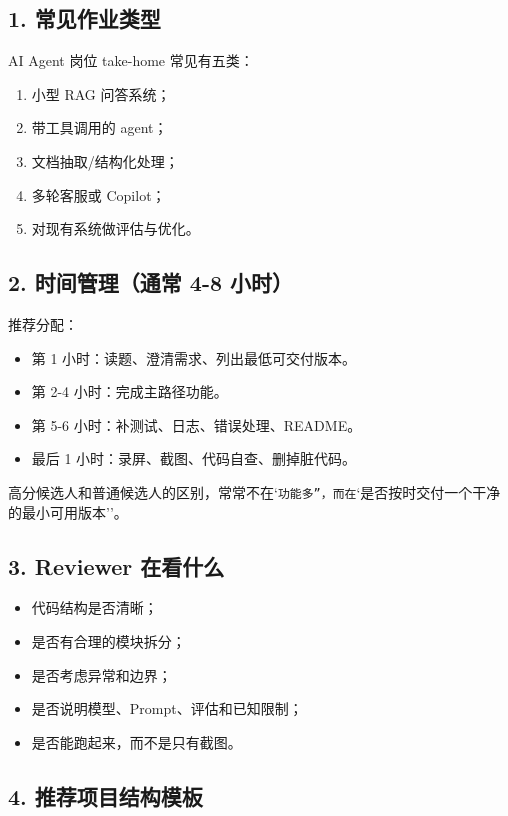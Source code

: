 \subsection{1. 常见作业类型}
AI Agent 岗位 take-home 常见有五类：

\begin{enumerate}[leftmargin=2em]
\item 小型 RAG 问答系统；
\item 带工具调用的 agent；
\item 文档抽取/结构化处理；
\item 多轮客服或 Copilot；
\item 对现有系统做评估与优化。
\end{enumerate}

\subsection{2. 时间管理（通常 4-8 小时）}
推荐分配：

\begin{itemize}[leftmargin=2em]
\item 第 1 小时：读题、澄清需求、列出最低可交付版本。
\item 第 2-4 小时：完成主路径功能。
\item 第 5-6 小时：补测试、日志、错误处理、README。
\item 最后 1 小时：录屏、截图、代码自查、删掉脏代码。
\end{itemize}

高分候选人和普通候选人的区别，常常不在`\texttt{功能多''，而在}`是否按时交付一个干净的最小可用版本''。


\subsection{3. Reviewer 在看什么}
\begin{itemize}[leftmargin=2em]
\item 代码结构是否清晰；
\item 是否有合理的模块拆分；
\item 是否考虑异常和边界；
\item 是否说明模型、Prompt、评估和已知限制；
\item 是否能跑起来，而不是只有截图。
\end{itemize}

\subsection{4. 推荐项目结构模板}

